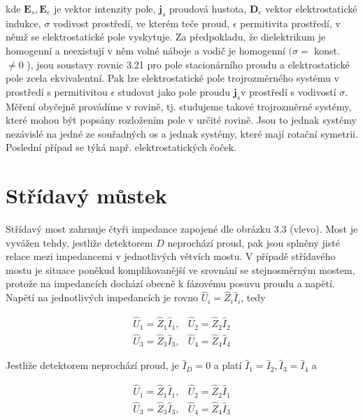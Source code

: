 \documentclass[10pt]{article}
\begin{document}
kde $\boldsymbol{E}_{s}, \boldsymbol{E}_{e}$ je vektor intenzity pole, $\boldsymbol{j}_{s}$ proudová hustota, $\boldsymbol{D}_{e}$ vektor elektrostatické indukce, $\sigma$ vodivost prostředí, ve kterém teče proud, $\epsilon$ permitivita prostředí, v němž se elektrostatické pole vyskytuje. Za předpokladu, že dielektrikum je homogenní a neexistují v něm volné náboje a vodič je homogenní $(\sigma=$ konst. $\neq 0$ ), jsou soustavy rovnic 3.21 pro pole stacionárního proudu a elektrostatické pole zcela ekvivalentní. Pak lze elektrostatické pole trojrozměrného systému v prostředí s permitivitou $\epsilon$ studovat jako pole proudu $\boldsymbol{j}_{s} \mathrm{v}$ prostředí s vodivostí $\sigma$. Měření obyčejně provádíme v rovině, tj. studujeme takové trojrozměrné systémy, které mohou být popsány rozložením pole v určité rovině. Jsou to jednak systémy nezávislé na jedné ze souřadných os a jednak systémy, které mají rotační symetrii. Poslední případ se týká např. elektrostatických čoček.

\section*{Střídavý můstek}
Střídavý most zahrnuje čtyři impedance zapojené dle obrázku 3.3 (vlevo). Most je vyvážen tehdy, jestliže detektorem $D$ neprochází proud, pak jsou splněny jisté relace mezi impedancemi v jednotlivých větvích mostu. V případě střídavého mostu je situace poněkud komplikovanější ve srovnání se stejnosměrným mostem, protože na impedancích dochází obecně k fázovému posuvu proudu a napětí. Napětí na jednotlivých impedancích je rovno $\hat{U}_{i}=\hat{Z}_{i} \hat{I}_{i}$, tedy

\[
\begin{array}{ll}
\hat{U}_{1}=\hat{Z}_{1} \hat{I}_{1}, & \hat{U}_{2}=\hat{Z}_{2} \hat{I}_{2} \\
\hat{U}_{3}=\hat{Z}_{3} \hat{I}_{3}, & \hat{U}_{4}=\hat{Z}_{4} \hat{I}_{4} \tag{3.22}
\end{array}
\]

Jestliže detektorem neprochází proud, je $\hat{I}_{D}=0$ a platí $\hat{I}_{1}=\hat{I}_{2}, \hat{I}_{3}=\hat{I}_{4}$ a

\[
\begin{array}{ll}
\hat{U}_{1}=\hat{Z}_{1} \hat{I}_{1}, & \hat{U}_{2}=\hat{Z}_{2} \hat{I}_{1} \\
\hat{U}_{3}=\hat{Z}_{3} \hat{I}_{3}, & \hat{U}_{4}=\hat{Z}_{4} \hat{I}_{3} \tag{3.23}
\end{array}
\]
\end{document}
